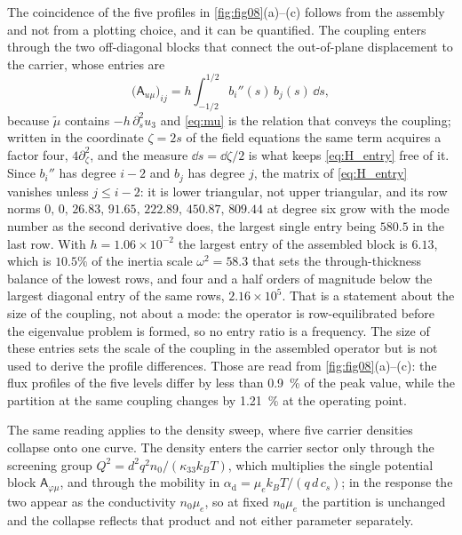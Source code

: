 The coincidence of the five profiles in \cref{fig:fig08}(a)--(c) follows
from the assembly and not from a plotting choice, and it can be quantified.  The coupling enters through the two off-diagonal blocks that connect
the out-of-plane displacement to the carrier, whose entries are
\begin{equation}
\label{eq:H_entry}
\bigl(\mathsf A_{u\mu}\bigr)_{ij}
=h\int_{-1/2}^{1/2}b_i''(s)\,b_j(s)\,\dd s ,
\end{equation}
because $\widetilde\mu$ contains $-h\,\partial_s^{2}u_3$ and \eqref{eq:mu} is
the relation that conveys the coupling; written in the coordinate $\zeta=2s$ of
the field equations the same term acquires a factor four, $4\partial_\zeta^{2}$,
and the measure $\dd s=\dd\zeta/2$ is what keeps \eqref{eq:H_entry} free of it.
Since $b_i''$ has degree $i-2$ and $b_j$ has degree $j$, the matrix of
\eqref{eq:H_entry} vanishes unless $j\le i-2$: it is lower triangular, not upper triangular, and its row norms
$0,\,0,\,26.83,\,91.65,\,222.89,\,450.87,\,809.44$ at degree six grow with the
mode number as the second derivative does, the largest single entry being
$580.5$ in the last row.  With $h=1.06\times10^{-2}$
the largest entry of the assembled block is $6.13$, which is $10.5\%$ of the
inertia scale $\omega^{2}=58.3$ that sets the through-thickness balance of the
lowest rows, and four and a half orders of magnitude below the largest diagonal
entry of the same rows, $2.16\times10^{5}$.  That is a statement about the size of the
coupling, not about a mode: the operator is row-equilibrated before the
eigenvalue problem is formed, so no entry ratio is a frequency.  The size of these entries sets the scale of the coupling in the
assembled operator but is not used to derive the profile differences.  Those are
read from \cref{fig:fig08}(a)--(c): the flux profiles of the five levels differ by
less than \SI{0.9}{\percent} of the peak value, while the partition at the same
coupling changes by \SI{1.21}{\percent} at the operating point.

The same reading applies to the density sweep, where five carrier densities
collapse onto one curve.  The density enters the carrier sector only through the
screening group $Q^{2}=d^{2}q^{2}n_0/(\kappa_{33}k_BT)$, which multiplies the
single potential block $\mathsf A_{\varphi\mu}$, and through the mobility in
$\alpha_{\mathrm d}=\mu_ek_BT/(q\,d\,c_s)$; in the response the two appear as the
conductivity $n_0\mu_e$, so at fixed $n_0\mu_e$ the partition is unchanged and
the collapse reflects that product and not either parameter separately.

